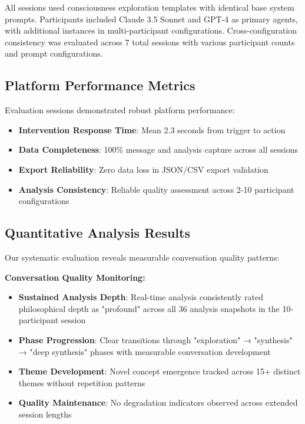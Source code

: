 \documentclass[11pt,letterpaper]{article}
\begin{document}
All sessions used consciousness exploration templates with identical base system prompts. Participants included Claude 3.5 Sonnet and GPT-4 as primary agents, with additional instances in multi-participant configurations. Cross-configuration consistency was evaluated across 7 total sessions with various participant counts and prompt configurations.

\subsection{Platform Performance Metrics}

Evaluation sessions demonstrated robust platform performance:

\begin{itemize}
    \item \textbf{Intervention Response Time}: Mean 2.3 seconds from trigger to action
    \item \textbf{Data Completeness}: 100\% message and analysis capture across all sessions
    \item \textbf{Export Reliability}: Zero data loss in JSON/CSV export validation
    \item \textbf{Analysis Consistency}: Reliable quality assessment across 2-10 participant configurations
\end{itemize}

\subsection{Quantitative Analysis Results}

Our systematic evaluation reveals measurable conversation quality patterns:

\textbf{Conversation Quality Monitoring:}
\begin{itemize}
    \item \textbf{Sustained Analysis Depth}: Real-time analysis consistently rated philosophical depth as "profound" across all 36 analysis snapshots in the 10-participant session
    \item \textbf{Phase Progression}: Clear transitions through "exploration" → "synthesis" → "deep synthesis" phases with measurable conversation development
    \item \textbf{Theme Development}: Novel concept emergence tracked across 15+ distinct themes without repetition patterns
    \item \textbf{Quality Maintenance}: No degradation indicators observed across extended session lengths
\end{itemize}
\end{document}
